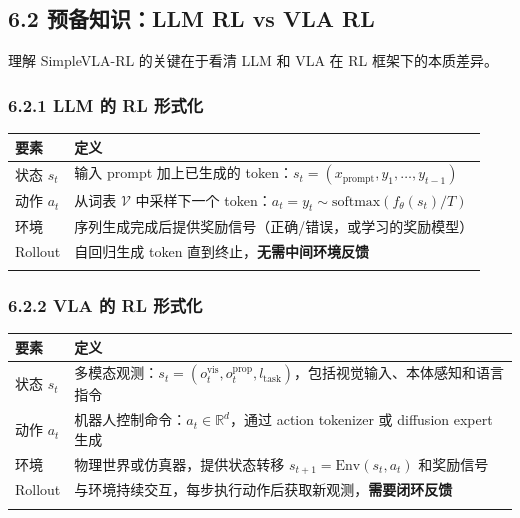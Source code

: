 \documentclass[
  chinese,
]{ctexart}
\begin{document}
\subsection{6.2 预备知识：LLM RL vs VLA
RL}\label{ux9884ux5907ux77e5ux8bc6llm-rl-vs-vla-rl}

理解 SimpleVLA-RL 的关键在于看清 LLM 和 VLA 在 RL 框架下的本质差异。

\subsubsection{6.2.1 LLM 的 RL
形式化}\label{llm-ux7684-rl-ux5f62ux5f0fux5316}

\begin{center}
\begin{tabular}{@{}>{\raggedright\arraybackslash}p{} >{\raggedright\arraybackslash}p{}@{}}
\toprule\noalign{}
要素 & 定义 \\
\midrule\noalign{}
状态 \(s_t\) & 输入 prompt 加上已生成的 token：\(s_t = (x_{\text{prompt}}, y_1, \ldots, y_{t-1})\) \\
动作 \(a_t\) & 从词表 \(\mathcal{V}\) 中采样下一个 token：\(a_t = y_t \sim \text{softmax}(f_\theta(s_t) / T)\) \\
环境 & 序列生成完成后提供奖励信号（正确/错误，或学习的奖励模型） \\
Rollout & 自回归生成 token 直到终止，\textbf{无需中间环境反馈} \\
\bottomrule\noalign{}
\end{tabular}
\end{center}

\subsubsection{6.2.2 VLA 的 RL
形式化}\label{vla-ux7684-rl-ux5f62ux5f0fux5316}

\begin{center}
\begin{tabular}{@{}>{\raggedright\arraybackslash}p{} >{\raggedright\arraybackslash}p{}@{}}
\toprule\noalign{}
要素 & 定义 \\
\midrule\noalign{}
状态 \(s_t\) & 多模态观测：\(s_t = (o_t^{\text{vis}}, o_t^{\text{prop}}, l_{\text{task}})\)，包括视觉输入、本体感知和语言指令 \\
动作 \(a_t\) & 机器人控制命令：\(a_t \in \mathbb{R}^d\)，通过 action tokenizer 或 diffusion expert 生成 \\
环境 & 物理世界或仿真器，提供状态转移 \(s_{t+1} = \text{Env}(s_t, a_t)\) 和奖励信号 \\
Rollout & 与环境持续交互，每步执行动作后获取新观测，\textbf{需要闭环反馈} \\
\bottomrule\noalign{}
\end{tabular}
\end{center}
\end{document}
